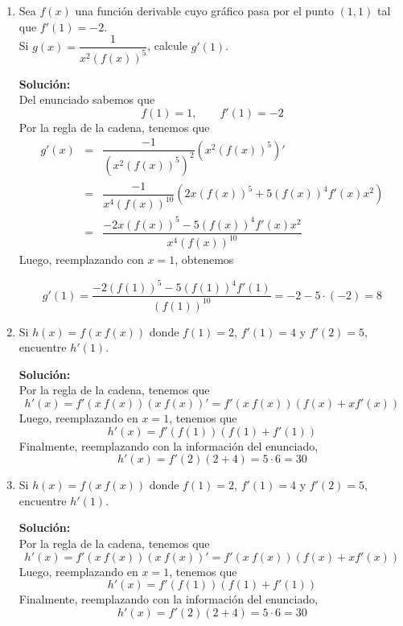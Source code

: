 \documentclass[12pt]{article}
\newenvironment{solucion}
{\begin{mdframed}[backgroundcolor=black!10]
		{\bf Solución:}\\
	}
	{
	\end{mdframed}
}
\newenvironment{preguntas}
{\begin{enumerate}\itemsep12pt
	}
	{
	\end{enumerate}
}
\begin{document}
\begin{preguntas}
\begin{solucion}
\begin{enumerate}[a)]
$$\begin{array}{rcl}
	f'(x) & = & 5^x ln(5) cos(3x) + 5^x (-\sin 3x)3 \\
	f'(x) & = & ln(5)5^x cos(3x) - 3\cdot 5^x \sin 3x
	\end{array}$$
\end{enumerate}
\end{solucion}
\item Sea $f(x)$ una función derivable cuyo gráfico pasa por el punto $(1,1)$ tal que $f'(1) = -2$.\\
Si $g(x) = \dfrac{1}{x^2(f(x))^5}$, calcule $g'(1)$.
\begin{solucion}
Del enunciado sabemos que
$$f(1) = 1, \qquad f'(1) = -2$$
Por la regla de la cadena, tenemos que
$$\begin{array}{rcl}
g'(x) & = & \dfrac{-1}{(x^2(f(x))^5)^2}(x^2(f(x))^5)'\\
& = & \dfrac{-1}{x^4(f(x))^{10}}(2x(f(x))^5 + 5(f(x))^4f'(x)x^2)\\
& = & \dfrac{-2x(f(x))^5 - 5(f(x))^4f'(x)x^2}{x^4(f(x))^{10}}
\end{array}$$
Luego, reemplazando con $x=1$, obtenemos

$$g'(1) =\dfrac{-2(f(1))^5 - 5(f(1))^4f'(1)}{(f(1))^{10}} = -2-5\cdot (-2) = 8$$
\end{solucion}
\item Si $h(x) = f(x\ f(x))$ donde $f(1)=2$, $f'(1)=4$ y $f'(2) = 5$, encuentre $h'(1)$.
\begin{solucion}
Por la regla de la cadena, tenemos que
$$h'(x) = f'(x\ f(x)) (x\ f(x))' = f'(x\ f(x))(f(x) + xf'(x))$$
Luego, reemplazando en $x=1$, tenemos que
$$h'(x) = f'(f(1))(f(1) + f'(1))$$
Finalmente, reemplazando con la información del enunciado,
$$h'(x) = f'(2)(2+4) = 5\cdot 6 = 30$$
\end{solucion}
\item Si $h(x) = f(x\ f(x))$ donde $f(1)=2$, $f'(1)=4$ y $f'(2) = 5$, encuentre $h'(1)$.
\begin{solucion}
Por la regla de la cadena, tenemos que
$$h'(x) = f'(x\ f(x)) (x\ f(x))' = f'(x\ f(x))(f(x) + xf'(x))$$
Luego, reemplazando en $x=1$, tenemos que
$$h'(x) = f'(f(1))(f(1) + f'(1))$$
Finalmente, reemplazando con la información del enunciado,
$$h'(x) = f'(2)(2+4) = 5\cdot 6 = 30$$
\end{solucion}
\end{preguntas}
\end{document}
